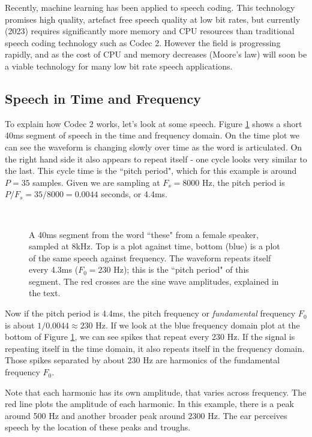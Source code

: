 \documentclass{article}
\begin{document}
{Recently, machine learning has been applied to speech coding.  This technology promises high quality, artefact free speech quality at low bit rates, but currently (2023) requires significantly more memory and CPU resources than traditional speech coding technology such as Codec 2.  However the field is progressing rapidly, and as the cost of CPU and memory decreases (Moore's law) will soon be a viable technology for many low bit rate speech applications.

\subsection{Speech in Time and Frequency}

To explain how Codec 2 works, let's look at some speech. Figure \ref{fig:hts2a_time} shows a short 40ms segment of speech in the time and frequency domain.  On the time plot we can see the waveform is changing slowly over time as the word is articulated.  On the right hand side it also appears to repeat itself - one cycle looks very similar to the last.  This cycle time is the ``pitch period", which for this example is around $P=35$ samples.  Given we are sampling at $F_s=8000$ Hz, the pitch period is $P/F_s=35/8000=0.0044$ seconds, or 4.4ms.

\begin{figure} [H]
\caption{ A 40ms segment from the word ``these" from a female speaker, sampled at 8kHz. Top is a plot against time, bottom (blue) is a plot of the same speech against frequency. The waveform repeats itself every 4.3ms ($F_0=230$ Hz); this is the ``pitch period" of this segment.  The red crosses are the sine wave amplitudes, explained in the text.}
\label{fig:hts2a_time}
\begin{center}

\\

\end{center}
\end{figure}

Now if the pitch period is 4.4ms, the pitch frequency or \emph{fundamental} frequency $F_0$ is about $1/0.0044 \approx 230$ Hz.  If we look at the blue frequency domain plot at the bottom of Figure \ref{fig:hts2a_time}, we can see spikes that repeat every 230 Hz.  If the signal is repeating itself in the time domain, it also repeats itself in the frequency domain.  Those spikes separated by about 230 Hz are harmonics of the fundamental frequency $F_0$.

Note that each harmonic has its own amplitude, that varies across frequency.  The red line plots the amplitude of each harmonic. In this example, there is a peak around 500 Hz and another broader peak around 2300 Hz.  The ear perceives speech by the location of these peaks and troughs.

}
\end{document}
